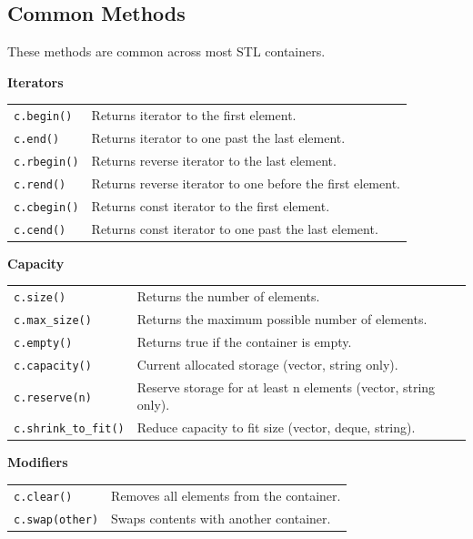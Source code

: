 \subsection{Common Methods}

These methods are common across most STL containers.

\textbf{Iterators}

\begin{tabularx}{\linewidth}{lX}
\texttt{c.begin()} & Returns iterator to the first element.\\
\texttt{c.end()} & Returns iterator to one past the last element.\\
\texttt{c.rbegin()} & Returns reverse iterator to the last element.\\
\texttt{c.rend()} & Returns reverse iterator to one before the first element.\\
\texttt{c.cbegin()} & Returns const iterator to the first element.\\
\texttt{c.cend()} & Returns const iterator to one past the last element.\\
\end{tabularx}

\textbf{Capacity}

\begin{tabularx}{\linewidth}{lX}
\texttt{c.size()} & Returns the number of elements.\\
\texttt{c.max\_size()} & Returns the maximum possible number of elements.\\
\texttt{c.empty()} & Returns true if the container is empty.\\
\texttt{c.capacity()} & Current allocated storage (vector, string only).\\
\texttt{c.reserve(n)} & Reserve storage for at least n elements (vector, string only).\\
\texttt{c.shrink\_to\_fit()} & Reduce capacity to fit size (vector, deque, string).\\
\end{tabularx}

\textbf{Modifiers}

\begin{tabularx}{\linewidth}{lX}
\texttt{c.clear()} & Removes all elements from the container.\\
\texttt{c.swap(other)} & Swaps contents with another container.\\
\end{tabularx}

